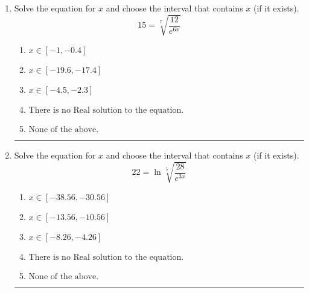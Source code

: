 \documentclass[14pt]{extbook}
\newcommand{\litem}[1]{\item#1\hspace*{-1cm}\rule{\textwidth}{0.4pt}}
\begin{document}
\begin{enumerate}
{\begin{enumerate}[label=\Alph*.]
\end{enumerate} }
\litem{
 Solve the equation for $x$ and choose the interval that contains $x$ (if it exists).\[  15 = \sqrt[7]{\frac{12}{e^{6x}}} \]\begin{enumerate}[label=\Alph*.]
\item \( x \in [-1, -0.4] \)
\item \( x \in [-19.6, -17.4] \)
\item \( x \in [-4.5, -2.3] \)
\item \( \text{There is no Real solution to the equation.} \)
\item \( \text{None of the above.} \)

\end{enumerate} }
\litem{
 Solve the equation for $x$ and choose the interval that contains $x$ (if it exists).\[  22 = \ln{\sqrt[5]{\frac{28}{e^{3x}}}} \]\begin{enumerate}[label=\Alph*.]
\item \( x \in [-38.56, -30.56] \)
\item \( x \in [-13.56, -10.56] \)
\item \( x \in [-8.26, -4.26] \)
\item \( \text{There is no Real solution to the equation.} \)
\item \( \text{None of the above.} \)

\end{enumerate} }
\end{enumerate}
\end{document}

